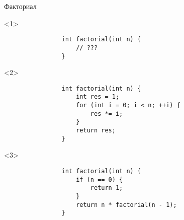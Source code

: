 \documentclass[aspectratio=169,14pt]{beamer}
\begin{document}
    \begin{frame}[fragile]{Факториал}
        \begin{onlyenv}<1>
            \begin{lstlisting}
                int factorial(int n) {
                    // ???
                }
            \end{lstlisting}
        \end{onlyenv}
        \begin{onlyenv}<2>
            \begin{lstlisting}
                int factorial(int n) {
                    int res = 1;
                    for (int i = 0; i < n; ++i) {
                        res *= i;
                    }
                    return res;
                }
            \end{lstlisting}
        \end{onlyenv}
        \begin{onlyenv}<3>
            \begin{lstlisting}
                int factorial(int n) {
                    if (n == 0) {
                        return 1;
                    }
                    return n * factorial(n - 1);
                }
            \end{lstlisting}
        \end{onlyenv}
    \end{frame}
\end{document}
